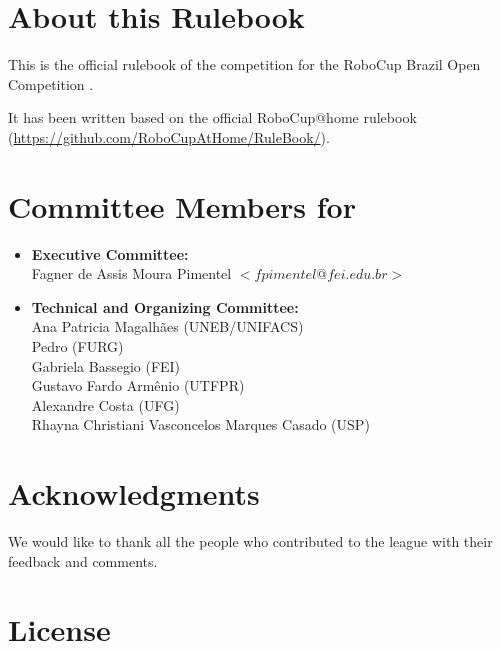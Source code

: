 

\section*{About this Rulebook}  
This is the official rulebook of the \AtHome{} competition for the RoboCup Brazil Open Competition \YEAR.

It has been written based on the official RoboCup@home rulebook (\url{https://github.com/RoboCupAtHome/RuleBook/}). 

\section*{Committee Members for \YEAR}
\begin{itemize}
    \item \textbf{Executive Committee:} \\ Fagner de Assis Moura Pimentel $<fpimentel@fei.edu.br>$
    \item \textbf{Technical and Organizing Committee:} \\ 
        Ana Patricia Magalhães (UNEB/UNIFACS) \\
        Pedro (FURG) \\
        Gabriela Bassegio (FEI) \\
        Gustavo Fardo Armênio (UTFPR) \\
        Alexandre Costa (UFG) \\
        Rhayna Christiani Vasconcelos Marques Casado (USP)
\end{itemize}

\section*{Acknowledgments}
\label{sec:acknowledgments}

We would like to thank all the people who contributed to the \AtHome{} league with their feedback and comments.

\vfill

\section*{License}

\doclicenseThis

